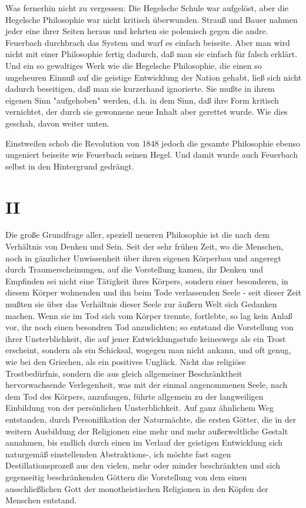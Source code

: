 Was fernerhin nicht zu vergessen: Die Hegelsche Schule war
aufgelöst, aber die Hegelsche Philosophie war nicht kritisch überwunden.
Strauß und Bauer nahmen jeder eine ihrer Seiten heraus und kehrten sie
polemisch gegen die andre. Feuerbach durchbrach das System und warf es
einfach beiseite. Aber man wird nicht mit einer Philosophie fertig
dadurch, daß man sie einfach für falsch erklärt. Und ein so gewaltiges
Werk wie die Hegelsche Philosophie, die einen so ungeheuren Einnuß auf
die geistige Entwicklung der Nation gehabt, ließ sich nicht dadurch
beseitigen, daß man sie kurzerhand ignorierte. Sie mußte in ihrem
eigenen Sinn "aufgehoben" werden, d.h. in dem Sinn, daß ihre Form
kritisch vernichtet, der durch sie gewonnene neue Inhalt aber gerettet
wurde. Wie dies geschah, davon weiter unten.

Einstweilen schob die Revolution von 1848 jedoch die gesamte
Philosophie ebenso ungeniert beiseite wie Feuerbach seinen Hegel. Und
damit wurde auch Feuerbach selbst in den Hintergrund gedrängt.

\pagebreak

\section{II}



Die große Grundfrage aller, speziell neueren Philosophie ist die
nach dem Verhältnis von Denken und Sein. Seit der sehr frühen Zeit, wo
die Menschen, noch in gänzlicher Unwissenheit über ihren eigenen
Körperbau und angeregt durch Traumerscheinungen, auf die Vorstellung
kamen, ihr Denken und Empfinden sei nicht eine Tätigkeit ihres Körpers,
sondern einer besonderen, in diesem Körper wohnenden und ihn beim Tode
verlassenden Seele - seit dieser Zeit mußten sie über das Verhältnis
dieser Seele zur äußern Welt sich Gedanken machen. Wenn sie im Tod sich
vom Körper trennte, fortlebte, so lag kein Anlaß vor, ihr noch einen
besondren Tod anzudichten; so entstand die Vorstellung von ihrer
Unsterblichkeit, die auf jener Entwicklungsstufe keineswegs als ein
Trost erscheint, sondern als ein Schicksal, wogegen man nicht ankann,
und oft genug, wie bei den Griechen, als ein positives Unglück. Nicht
das religiöse Trostbedürfnis, sondern die aus gleich allgemeiner
Beschränktheit hervorwachsende Verlegenheit, was mit der einmal
angenommenen Seele, nach dem Tod des Körpers, anzufangen, führte
allgemein zu der langweiligen Einbildung von der persönlichen
Unsterblichkeit. Auf ganz ähnlichem Weg entstanden, durch
Personifikation der Naturmächte, die ersten Götter, die in der weitern
Ausbildung der Religionen eine mehr und mehr außerweltliche Gestalt
annahmen, bis endlich durch einen im Verlauf der geistigen Entwicklung
sich naturgemäß einstellenden Abstraktions-, ich möchte fast sagen
Destillationsprozeß aus den vielen, mehr oder minder beschränkten und
sich gegenseitig beschränkenden Göttern die Vorstellung von dem einen
ausschließlichen Gott der monotheistischen Religionen in den Köpfen der
Menschen entstand.

